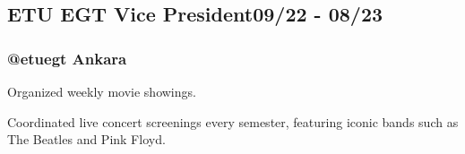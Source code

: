 \documentclass[a4paper,12pt]{article}
\begin{document}
\vspace*{10pt}
\subsection{{ETU EGT Vice President}\hfill 09/22 - 08/23}
\subsubsection*{@etuegt \hfill Ankara}
\begin{zitemize}
    \item Organized weekly movie showings.
    \item Coordinated live concert screenings every semester, featuring iconic bands such as The Beatles and Pink Floyd.
\end{zitemize}
\end{document}
